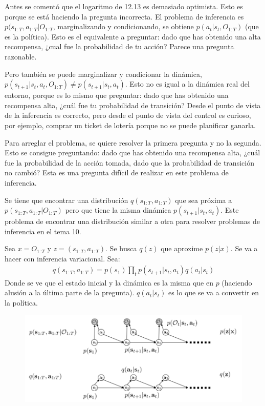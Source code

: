  Antes se comentó que el logaritmo de 12.13 es demasiado optimista. Esto es porque se está
 haciendo la pregunta incorrecta. El problema de inferencia es $p(s_{1:T},a_{1:T}|O_{1:T}$,
 marginalizando y condicionando, se obtiene $p(a_t|s_t,O_{1:T})$ (que es la política). Esto es
 el equivalente a preguntar: dado que has obtenido una alta recompensa, ¿cual fue la
 probabilidad de tu acción? Parece una pregunta razonable.

 Pero también se puede marginalizar y condicionar la dinámica,
 $p(s_{t+1}|s_t,a_t,O_{1:T})\neq p(s_{t+1}|s_t,a_t)$. Esto no es igual a la dinámica real del
 entorno, porque es lo mismo que preguntar: dado que has obtenido una recompensa alta,
 ¿cuál fue tu probabilidad de transición? Desde el punto de vista de la inferencia es
 correcto, pero desde el punto de vista del control es curioso, por ejemplo, comprar un ticket de
 lotería porque no se puede planificar ganarla.

 Para arreglar el problema, se quiere resolver la primera pregunta y no la segunda. Esto se
 consigue preguntando: dado que has obtenido una recompensa alta, ¿cuál fue la probabilidad de
 la acción tomada, dado que la probabilidad de transición no cambió? Esta es una pregunta difícil
 de realizar en este problema de inferencia.

 Se tiene que encontrar una distribución $q(s_{1:T},a_{1:T})$ que sea próxima a
 $p(s_{1:T},a_{1:T}|O_{1:T})$ pero que tiene la misma dinámica $p(s_{t+1}|s_t,a_t)$. Este
 problema de encontrar una distribución similar a otra para resolver problemas de
 inferencia en el tema 10.

 Sea $x=O_{1:T}$ y $z=(s_{1:T},a_{1:T})$. Se busca $q(z)$ que aproxime $p(z|x)$. Se va a
 hacer con inferencia variacional. Sea:
 \begin{align}
q ( s _ { 1 : T } , a _ { 1 : T } ) = p ( s _ { 1 } ) \prod _ { t } p ( s _ { t + 1 } | s _ { t } , a _ { t } ) q ( a _ { t } | s _ { t } )
 \end{align}
 Donde se ve que el estado inicial y la dinámica es la misma que en $p$ (haciendo alusión a
 la última parte de la pregunta). $q(a_t|s_t)$ es lo que se va a convertir en la política.

\begin{figure}[H]
	\centering
	\includegraphics[width=0.8\linewidth]{figures/2020-07-04-205833_888x356_scrot.png}
\end{figure}

